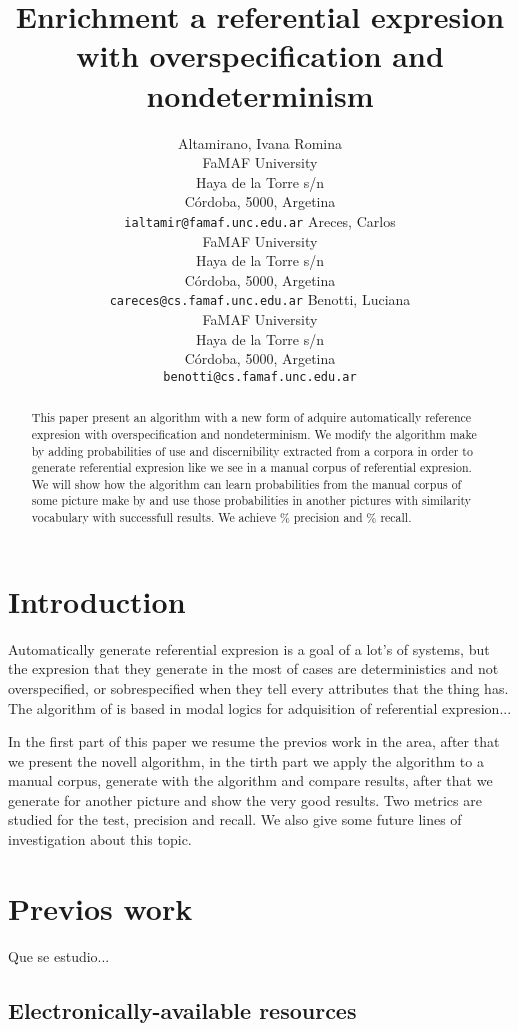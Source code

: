 \documentclass[11pt,letterpaper]{article}
\title{Enrichment a referential expresion with overspecification and nondeterminism}
\author{Altamirano, Ivana Romina\\
	    FaMAF University\\
	    Haya de la Torre s/n\\
	    C\'ordoba, 5000, Argetina\\
	    {\tt ialtamir@famaf.unc.edu.ar}
	  \And
	Areces, Carlos\\
	    FaMAF University\\
	    Haya de la Torre s/n\\
	    C\'ordoba, 5000, Argetina\\
	    {\tt careces@cs.famaf.unc.edu.ar}
	  \And
	Benotti, Luciana\\
	    FaMAF University\\
	    Haya de la Torre s/n\\
	    C\'ordoba, 5000, Argetina\\
	    {\tt benotti@cs.famaf.unc.edu.ar}}
\date{}
\begin{document}
\maketitle
\begin{abstract}
  This paper present an algorithm with a new form of adquire automatically reference expresion with overspecification and nondeterminism. We modify the algorithm make by \cite{areces08} adding probabilities of use and discernibility extracted from a corpora in order to generate referential expresion like we see in a manual corpus of referential expresion. We will show how the algorithm can learn probabilities from the manual corpus of some picture make by \cite{viethen} and use those probabilities in another pictures with similarity vocabulary with successfull results. We achieve \% precision and \% recall. 

\end{abstract}

\section{Introduction}

Automatically generate referential expresion is a goal of a lot's of systems, but the expresion that they generate in the most of cases are deterministics and not overspecified, or sobrespecified when they tell every attributes that the thing has.
The algorithm of \cite{areces08} is based in modal logics for adquisition of referential expresion...

In the first part of this paper we resume the previos work in the area, after that we present the novell algorithm, in the tirth part we apply the algorithm to a manual corpus, generate with the algorithm and compare results, after that we generate for another picture and show the very good results. Two metrics are studied for the test, precision and recall. We also give some future lines of investigation about this topic.  

\section{Previos work}

Que se estudio... 




\subsection{Electronically-available resources}
\end{document}
